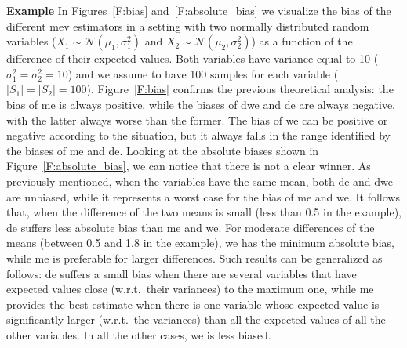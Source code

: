 \textbf{Example} In Figures~\ref{F:bias} and~\ref{F:absolute_bias} we visualize the bias of the different \gls{mev} estimators in a setting with two normally distributed random variables ($X_1\sim\mathcal{N}(\mu_1,\sigma_1^2)$ and $X_2\sim\mathcal{N}(\mu_2,\sigma_2^2)$) as a function of the difference of their expected values. Both variables have variance equal to 10 ($\sigma_1^2=\sigma_2^2=10$) and we assume to have 100 samples for each variable ($|S_1|=|S_2|=100$).
Figure~\ref{F:bias} confirms the previous theoretical analysis: the bias of \gls{me} is always positive, while the biases of \gls{dwe} and \gls{de} are always negative, with the latter always worse than the former.
The bias of \gls{we} can be positive or negative according to the situation, but it always falls in the range identified by the biases of \gls{me} and \gls{de}.
Looking at the absolute biases shown in Figure~\ref{F:absolute_bias}, we can notice that there is not a clear winner.
As previously mentioned, when the variables have the same mean, both \gls{de} and \gls{dwe} are unbiased, while it represents a worst case for the bias of \gls{me} and \gls{we}. It follows that, when the difference of the two means is small (less than 0.5 in the example), \gls{de} suffers less absolute bias than \gls{me} and \gls{we}. For moderate differences of the means (between 0.5 and 1.8 in the example), \gls{we} has the minimum absolute bias, while \gls{me} is preferable for larger differences.
Such results can be generalized as follows: \gls{de} suffers a small bias when there are several variables that have expected values close (w.r.t.~their variances) to the maximum one, while \gls{me} provides the best estimate when there is one variable whose expected value is significantly larger (w.r.t.~the variances) than all the expected values of all the other variables. In all the other cases, \gls{we} is less biased.

